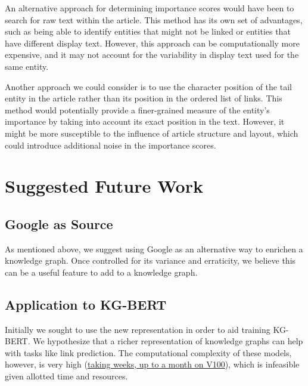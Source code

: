 \documentclass{article}
\begin{document}
An alternative approach for determining importance scores would have been to search for raw text within the article. This method has its own set of advantages, such as being able to identify entities that might not be linked or entities that have different display text. However, this approach can be computationally more expensive, and it may not account for the variability in display text used for the same entity.

Another approach we could consider is to use the character position of the tail entity in the article rather than its position in the ordered list of links. This method would potentially provide a finer-grained measure of the entity's importance by taking into account its exact position in the text. However, it might be more susceptible to the influence of article structure and layout, which could introduce additional noise in the importance scores.

\section{Suggested Future Work}
\subsection{Google as Source}
As mentioned above, we suggest using Google as an alternative way to enrichen a knowledge graph. Once controlled for its variance and erraticity, we believe this can be a useful feature to add to a knowledge graph.

\subsection{Application to KG-BERT}
Initially we sought to use the new representation in order to aid training KG-BERT. We hypothesize that a richer representation of knowledge graphs can help with tasks like link prediction. The computational complexity of these models, however, is very high (\href{https://github.com/yao8839836/kg-bert/issues/8}{taking weeks, up to a month on V100}), which is infeasible given allotted time and resources.



\end{document}

